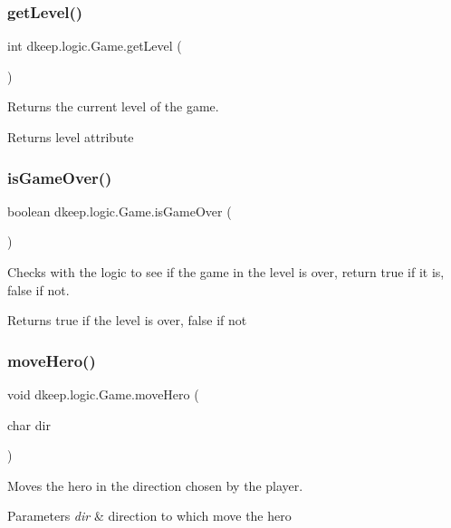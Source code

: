 \subsubsection{\texorpdfstring{get\+Level()}{getLevel()}}
{\footnotesize\ttfamily int dkeep.\+logic.\+Game.\+get\+Level (\begin{DoxyParamCaption}{ }\end{DoxyParamCaption})}

Returns the current level of the game. \begin{DoxyReturn}{Returns}
level attribute 
\end{DoxyReturn}
\mbox{\label{classdkeep_1_1logic_1_1_game_a6f548ad7f01432adb418f5891f130ec4}} 
\subsubsection{\texorpdfstring{is\+Game\+Over()}{isGameOver()}}
{\footnotesize\ttfamily boolean dkeep.\+logic.\+Game.\+is\+Game\+Over (\begin{DoxyParamCaption}{ }\end{DoxyParamCaption})}

Checks with the logic to see if the game in the level is over, return true if it is, false if not. \begin{DoxyReturn}{Returns}
true if the level is over, false if not 
\end{DoxyReturn}
\mbox{\label{classdkeep_1_1logic_1_1_game_a10736bc5627d884177a850b7b3182fb4}} 
\subsubsection{\texorpdfstring{move\+Hero()}{moveHero()}}
{\footnotesize\ttfamily void dkeep.\+logic.\+Game.\+move\+Hero (\begin{DoxyParamCaption}\item[{char}]{dir }\end{DoxyParamCaption})}

Moves the hero in the direction chosen by the player. 
\begin{DoxyParams}{Parameters}
{\em dir} & direction to which move the hero \\
\hline
\end{DoxyParams}
\mbox{\label{classdkeep_1_1logic_1_1_game_af80ce295e13bccbe8fe6f48399d4d808}} 
